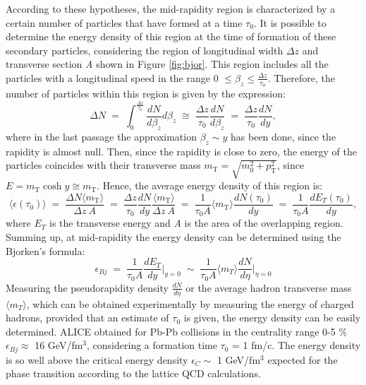 %
According to these hypotheses, the mid-rapidity region is characterized by a certain number of particles that have formed at a time $\tau_{0}$. It is possible to determine the energy density of this region at the time of formation of these secondary particles, considering the region of longitudinal width $\Delta z$ and transverse section \textit{A} shown in Figure \ref{fig:bjor}. This region includes all the particles with a longitudinal speed in the range 0 $\leq \beta_{z} \leq \frac{\Delta z}{\tau_{0}}$. Therefore, the number of particles within this region is given by the expression:
\begin{equation}
 \Delta N \;=\; \int_{0}^{\frac{\Delta z}{\tau_{0}}} \frac{dN}{d\beta_{z}}d\beta_{z}\;\cong\;\frac{\Delta z}{\tau_{0}}\frac{dN}{d\beta_{z}}\;=\;\frac{\Delta z}{\tau_{0}}\frac{dN}{dy},
\end{equation}
where in the last passage the approximation $\beta_{z}\sim y$ has been done, since the rapidity is almost null. Then, since the rapidity is close to zero, the energy of the particles coincides with their transverse mass $m_{\mathrm{T}} = \sqrt{m_{0}^{2} + p_{\mathrm{T}}^{2}}$, since $E = m_{\mathrm{T}} \cosh y \cong  m_{\mathrm{T}}$. Hence, the average energy density of this region is:
\begin{equation}
 \langle \epsilon(\tau_{0}) \rangle \; = \; \frac{\Delta N\langle m_{\mathrm{T}}\rangle}{\Delta z\:A}\;=\;\frac{\Delta z}{\tau_{0}}\frac{dN}{dy}\frac{\langle m_{\mathrm{T}}\rangle}{\Delta z\:A}\;=\;\frac{1}{\tau_{0} A} \langle m_{\mathrm{T}} \rangle \frac{dN(\tau_{0})}{dy}\;=\;\frac{1}{\tau_{0} A}\frac{dE_{T}(\tau_{0})}{dy},
\end{equation}
where $E_{T}$ is the transverse energy and \textit{A} is the area of the overlapping region.\\
Summing up, at mid-rapidity the energy density can be determined using the Bjorken's formula:
\begin{equation}
 \epsilon_{Bj}\;=\; \frac{1}{\tau_{0} A}\frac{dE_{T}}{dy}\Big|_{y=0}\;\sim\;\frac{1}{\tau_{0} A}\langle m_{T} \rangle \frac{dN}{d\eta}\Big|_{\eta=0}
\end{equation}
Measuring the pseudorapidity density $\frac{dN}{d\eta}$ or the average hadron transverse mass $\langle m_{T} \rangle$, which can be obtained experimentally by measuring the energy of charged hadrons, provided that an estimate of $\tau_{0}$ is given, the energy density can be easily determined. ALICE obtained for Pb-Pb collisions in the centrality range 0-5 \% $\epsilon_{Bj} \approx$ 16 GeV/fm$^{3}$, considering a formation time $\tau_{0}$ = 1 fm/c. The energy density is so well above the critical energy density $\epsilon_{C} \sim$ 1 GeV/fm$^{3}$ expected for the phase transition according to the lattice QCD calculations.\\
